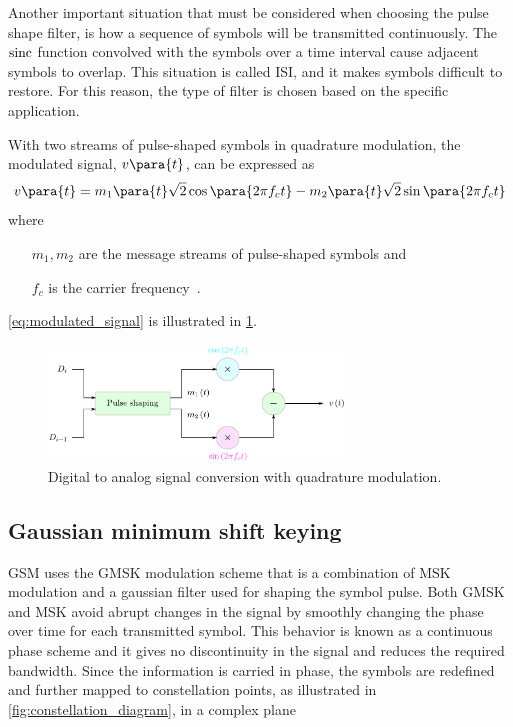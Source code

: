 Another important situation that must be considered when choosing the
pulse shape filter, is how a sequence of symbols will be transmitted
continuously. The $\operatorname{sinc}$ function convolved with the symbols over a
time interval cause adjacent symbols to overlap. This situation is
called \gls{ISI}, and it makes symbols difficult to restore. For this
reason, the type of filter is chosen based on the specific
application.

With two streams of pulse-shaped symbols in quadrature modulation, the
modulated signal, $v \para{t}$, can be expressed as
\begin{equation}
  v \para{t} =
  m_1 \para{t} \sqrt{2}\cos \para{2 \pi f_c t} -
  m_2 \para{t} \sqrt{2}\sin \para{2 \pi f_c t}
\label{eq:modulated_signal}
\end{equation}
where
\begin{itemize}[labelindent=\parindent]
\item[$m_1, m_2$] are the message streams of pulse-shaped symbols and
\item[$f_c$] is the carrier frequency~\cite[p. 102]{onion}.
\end{itemize}

\cref{eq:modulated_signal} is illustrated in
\cref{fig:signal_generation_diagram}.

\begin{figure}
  \centering
  \includegraphics[width=0.7\textwidth]{figures/signal_generation_diagram}
  \caption{Digital to analog signal conversion with quadrature modulation.}
  \label{fig:signal_generation_diagram}
\end{figure}
\subsection{Gaussian minimum shift keying}
%
\gls{GSM} uses the \gls{GMSK} modulation scheme that is a combination
of \gls{MSK} modulation and a gaussian filter used for shaping the
symbol pulse. Both \gls{GMSK} and \gls{MSK} avoid abrupt changes in
the signal by smoothly changing the phase over time for each
transmitted symbol. This behavior is known as a continuous phase
scheme and it gives no discontinuity in the signal and reduces the
required bandwidth. Since the information is carried in phase, the
symbols are redefined and further mapped to constellation points, as
illustrated in \cref{fig:constellation_diagram}, in a complex plane

